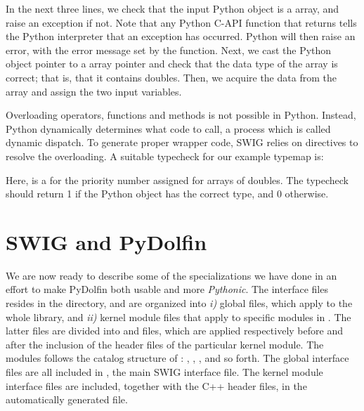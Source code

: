 In the next three lines, we check that the input Python object is a \numpy array, and raise an exception if not.
Note that any Python C-API function that returns  tells the
Python interpreter that an exception has occurred. Python will then raise
an error, with the error message set by the 
function. Next, we cast the Python object pointer to a \numpy array pointer
and check that the data type of the \numpy array is correct; that is, that it contains doubles. Then, we acquire the data from the \numpy array and assign the two input variables.\par

Overloading operators, functions and methods is not possible in Python.
Instead, Python dynamically determines what code to call,  
a process which is called dynamic dispatch.
To generate proper wrapper code, 
SWIG relies on  directives to resolve the overloading. 
A suitable typecheck for our example typemap is:
Here,  is a  for the priority number assigned for arrays of doubles. The typecheck should return 1 if the Python object  has the correct type, and 0 otherwise.
\section{SWIG and PyDolfin}
We are now ready to describe some of the specializations we have done in an effort to make PyDolfin both usable and more \textit{Pythonic}. The interface files resides in the  directory, and are organized into \textit{i)} global files, which apply to the whole \dolfin library, and \textit{ii)} kernel module files that apply to specific modules in \dolfin. The latter files are divided into  and  files, which are applied respectively before and after the inclusion of the header files of the particular kernel module. The modules follows the catalog structure of \dolfin: , , ,  and so forth. The global interface files are all included in , the main SWIG interface file. The kernel module interface files are included, together with the C++ header files, in the automatically generated  file.\par

